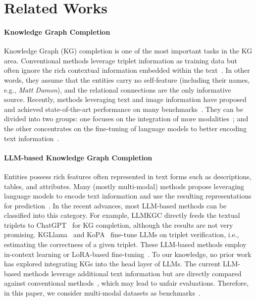 \section{Related Works}
\label{sec:related}

\paragraph{Knowledge Graph Completion}
Knowledge Graph (KG) completion is one of the most important tasks in the KG area. Conventional methods leverage triplet information as training data but often ignore the rich contextual information embedded within the text~\cite{TransE,ConvE,RSN,CompGCN,decentRL,HittER,DET,NeoEA}. In other words, they assume that the entities carry no self-feature (including their names, e.g., \textit{Matt Damon}), and the relational connections are the only informative source. Recently, methods leveraging text and image information have proposed and achieved state-of-the-art performance on many benchmarks~\cite{xie_image-embodied_2017-IKRL,wang_multimodal_2019-TransAE,KG-Bert,KGLM,FLT-LM,DBLP:conf/ijcnn/ZhangCZ23-MANS,GEEA}. They can be divided into two groups: one focuses on the integration of more modalities~\cite{DBLP:journals/apin/LuWJHL22-MMKRL,lee_vista_2023-VISTA,MAT}; and the other concentrates on the fine-tuning of language models to better encoding text information~\cite{KG-Bert,KGLM,FLT-LM}. 

\paragraph{LLM-based Knowledge Graph Completion}
Entities possess rich features often represented in text forms such as descriptions, tables, and attributes. Many (mostly multi-modal) methods propose leveraging language models to encode text information and use the resulting representations for prediction~\cite{KG-Bert,StAR,FLT-LM,KGLM,Meaformer,DBLP:conf/sigir/ZhangCGXHLZC24,DBLP:journals/corr/abs-2405-16869,DBLP:journals/corr/abs-2410-07526}. In the recent advances, most LLM-based methods can be classified into this category. For example, LLMKGC \cite{llmkgc-ningyu} directly feeds the textual triplets to ChatGPT~\cite{chatgpt} for KG completion, although the results are not very promising. KGLlama~\cite{KGllama} and KoPA~\cite{KoPa} fine-tune LLMs on triplet verification, i.e., estimating the correctness of a given triplet. These LLM-based methods employ in-context learning or LoRA-based fine-tuning~\cite{icl1,icl2}. To our knowledge, no prior work has explored integrating KGs into the head layer of LLMs. The current LLM-based methods leverage additional text information but are directly compared against conventional methods~\cite{KGllama,KoPa,kicgpt}, which may lead to unfair evaluations. Therefore, in this paper, we consider multi-modal datasets as benchmarks~\cite{MMKG,MMRNS,DBLP:journals/corr/abs-2402-05391}.


